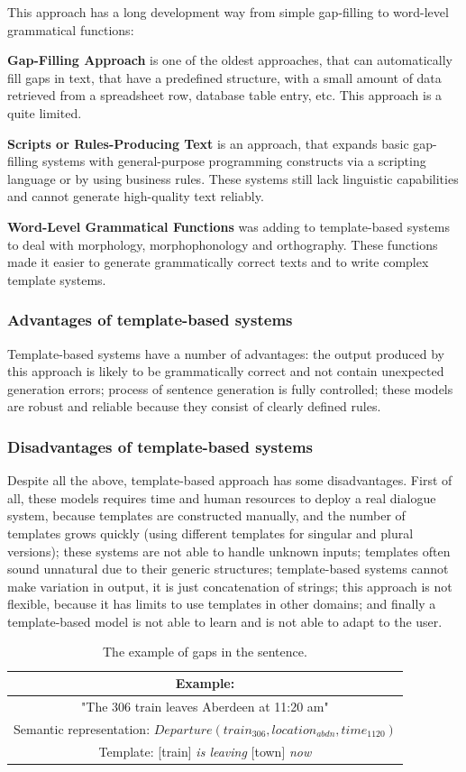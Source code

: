 This approach has a long development way from simple gap-filling to word-level grammatical functions:

\textbf{Gap-Filling Approach} is one of the oldest approaches, that can automatically fill gaps in text, that have a predefined structure, with a small amount of data retrieved from a spreadsheet row, database table entry, etc. This approach is a quite limited.

\textbf{Scripts or Rules-Producing Text} is an approach, that expands basic gap-filling systems with general-purpose programming constructs via a scripting language or by using business rules. These systems still lack linguistic capabilities and cannot generate high-quality text reliably.

\textbf{Word-Level Grammatical Functions} was adding to template-based systems to deal with morphology, morphophonology and orthography. These functions made it easier to generate grammatically correct texts and to write complex template systems.

\subsubsection{Advantages of template-based systems}
Template-based systems have a number of advantages: the output produced by this approach is likely to be grammatically correct and not contain unexpected generation errors; process of sentence generation is fully controlled; these models are robust and reliable because they consist of clearly defined rules.

\subsubsection{Disadvantages of template-based systems}
Despite all the above, template-based approach has some disadvantages. First of all, these models requires time and human resources to deploy a real dialogue system, because templates are constructed manually, and the number of templates grows quickly (using different templates for singular and plural versions); these systems are not able to handle unknown inputs; templates often sound unnatural due to their generic structures; template-based systems cannot make variation in output, it is just concatenation of strings; this approach is not flexible, because it has limits to use templates in other domains; and finally a template-based model is not able to learn and is not able to adapt to the user.

\begin{table}[t]
\centering
 \begin{tabular}{|c|} 
 \hline
 Example: \\
 \hline
 "The 306 train leaves Aberdeen at 11:20 am" \\ 
 \hline
 Semantic representation: 
 $Departure(train_{306}, location_{abdn}, time_{1120})$ \\
 \hline
 Template: 
 [train] \textit{is leaving} [town] \textit{now} \\
 \hline
 \end{tabular}
 \caption{The example of gaps in the sentence.}
\label{tab:tb_example}
\end{table}

